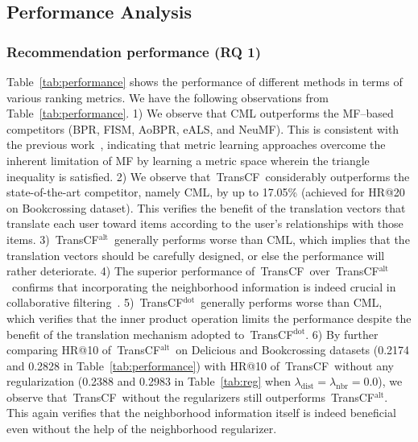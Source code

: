 \documentclass[conference]{IEEEtran}
\newcommand{\propose}{\textsf{{TransCF}}}
\newcommand{\proposealt}{\propose$^{\mathrm{alt}}$}
\newcommand{\proposedot}{\propose$^{\mathrm{dot}}$}
\begin{document}
\subsection{Performance Analysis}
\label{exp:quant}
\subsubsection{\textbf{Recommendation performance (RQ 1)}}
Table~\ref{tab:performance} shows the performance of different methods in terms of various ranking metrics.
We have the following observations from Table~\ref{tab:performance}. 1) We observe that CML outperforms the MF--based competitors (BPR, FISM, AoBPR, eALS, and NeuMF). This is consistent with the previous work~\cite{hsieh2017collaborative}, indicating that metric learning approaches overcome the inherent limitation of MF by learning a metric space wherein the triangle inequality is satisfied.
2) We observe that~\propose~considerably outperforms the state-of-the-art competitor, namely CML, by up to 17.05\% (achieved for HR@20 on Bookcrossing dataset). 
This verifies the benefit of the translation vectors that translate each user toward items according to the user's relationships with those items. 
3)~\proposealt~generally performs worse than CML, which implies that the translation vectors should be carefully designed, or else the performance will rather deteriorate.
4) The superior performance of~\propose~over~\proposealt~confirms that incorporating the neighborhood information is indeed crucial in collaborative filtering~\cite{koren2008factorization,kabbur2013fism,wu2016collaborative}. 
5)~\proposedot~generally performs worse than CML, which verifies that the inner product operation limits the performance despite the benefit of the translation mechanism adopted to~\proposedot.
6) By further comparing HR@10 of~\proposealt~on Delicious and Bookcrossing datasets (0.2174 and 0.2828 in Table~\ref{tab:performance}) with HR@10 of~\propose~without any regularization (0.2388 and 0.2983 in Table~\ref{tab:reg} when $\lambda_{\mathrm{dist}}=\lambda_{\mathrm{nbr}}=0.0$), we observe that~\propose~without the regularizers still outperforms~\proposealt. This again verifies that the neighborhood information itself is indeed beneficial even without the help of the neighborhood regularizer. 
\end{document}
